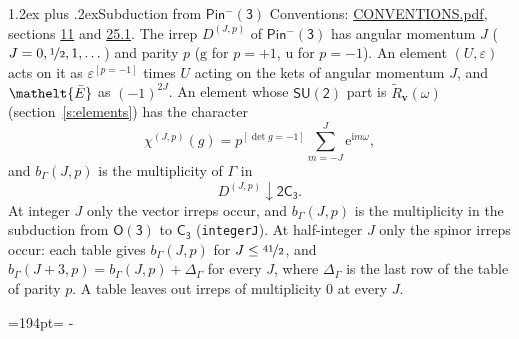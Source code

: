 \documentclass[10pt,a4paper]{article}
\makeatletter
\renewcommand\section{\@startsection{section}{1}{\z@}{-3ex plus -1ex minus -.2ex}%
  {1.2ex plus .2ex}{\normalfont\large\sffamily\bfseries\color{parttitle}}}
\newcommand{\needspace}[1]{\par\penalty-100\begingroup\dimen0=#1\relax\dimen2=\pagegoal
  \advance\dimen2-\pagetotal\ifdim\dimen0>\dimen2\relax\ifdim\dimen2>0pt\vfil\break\fi\fi
  \endgroup}
\numberwithin{equation}{section}
\newcommand{\eltfont}[1]{{\let\sigma\eltsigma\mathelt{#1}}}
\newcommand{\grp}[1]{\mathsf{#1}}
\newcommand{\elt}[1]{\eltfont{#1}}
\newcommand{\ptag}[1]{\mathrm{#1}}
\newcommand{\iverson}[1]{[#1]}
\newcommand{\restr}[2]{#1\!\downarrow#2}
\newcommand{\vv}{\mathbf{v}}
\newcommand{\iunit}{\mathrm{i}}
\newcommand{\expe}{\mathrm{e}}
\newcommand{\irrJp}[2]{D^{(#1,#2)}}
\newcommand{\barred}[1]{\bar{#1}}
\newcommand{\lift}[1]{\tilde{#1}}
\makeatother
\begin{document}
\section{Subduction from \texorpdfstring{$\grp{Pin^{-}(3)}$}{Pin(3)}}\label{s:subduction_parent}
Conventions: \href{../../CONVENTIONS.pdf}{CONVENTIONS.pdf}, sections \href{../../../rotation/CONVENTIONS.pdf\#conv.11}{11} and \href{../../CONVENTIONS.pdf\#conv.25.1}{25.1}.
\leavevmode\label{n:index.J}\label{n:index.parity}\label{n:irrep.o3}The irrep $\irrJp{J}{p}$ of \href{Pinminus3.pdf}{$\grp{Pin^{-}(3)}$} has angular momentum $J$ ($J = 0, \nicefrac{1}{2}, 1, \dots$) and parity $p$ ($\ptag{g}$ for $p = +1$, $\ptag{u}$ for $p = -1$). An element $(U, \varepsilon)$ acts on it as $\varepsilon^{[p = -1]}$ times $U$ acting on the kets of angular momentum $J$, and $\elt{\barred{E}}$ as $(-1)^{2J}$. \label{n:function.character.parent}\label{n:function.multiplicity}An element whose $\grp{SU(2)}$ part is $\lift{R}_{\vv}(\omega)$ (section~\ref{s:elements}) has the character
\begin{equation}\label{e:chi}\chi^{(J,p)}(g) = p^{\iverson{\det g = -1}}\sum_{m=-J}^{J} \expe^{\iunit m\omega},\end{equation}
and $b_\Gamma(J, p)$ is the multiplicity of $\Gamma$ in
\begin{equation}\label{e:parent}\restr{\irrJp{J}{p}}{\grp{2C_{3}}}.\end{equation}
At integer $J$ only the vector irreps occur, and $b_\Gamma(J, p)$ is the multiplicity in the subduction from $\grp{O(3)}$ to \href{../../../rotation/data/pdf/C3.pdf}{$\grp{C_{3}}$} (\texttt{integerJ}). \label{n:index.increment}At half-integer $J$ only the spinor irreps occur: each table gives $b_\Gamma(J, p)$ for $J \le \nicefrac{41}{2}$, and $b_\Gamma(J + 3, p) = b_\Gamma(J, p) + \Delta_\Gamma$ for every $J$, where $\Delta_\Gamma$ is the last row of the table of parity $p$. A table leaves out irreps of multiplicity 0 at every $J$.
\needspace{194pt}
\end{document}
